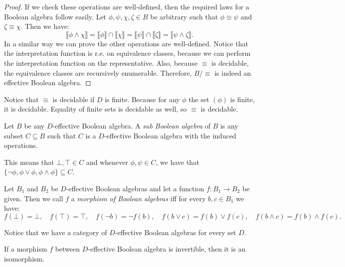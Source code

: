 \begin{proof}
If we check these operations are well-defined, then the required laws for a Boolean algebra follow easily. Let $\phi, \psi, \chi, \zeta \in B$ be arbitrary such that $\phi \equiv \psi$ and $\zeta \equiv \chi$. Then we have:
\[\llbracket \phi \wedge \chi \rrbracket = \llbracket \phi \rrbracket \cap \llbracket \chi \rrbracket = \llbracket \psi \rrbracket \cap \llbracket \zeta \rrbracket = \llbracket \psi \wedge \zeta \rrbracket.\]
In a similar way we can prove the other operations are well-defined. Notice that the interpretation function is r.e. on equivalence classes, because we can perform the interpretation function on the representative. Also, because $\equiv$ is decidable, the equivalence classes are recursively enumerable. Therefore, $B/{\equiv}$ is indeed an effective Boolean algebra. 
\end{proof}

Notice that $\equiv$ is decidable if $D$ is finite. Because for any $\phi$ the set $(\phi)$ is finite, it is decidable. Equality of finite sets is decidable as well, so $\equiv$ is decidable. 

\begin{definition}
Let $B$ be any $D$-effective Boolean algebra. A \emph{sub Boolean algebra} of $B$ is any subset $C \subseteq B$ such that $C$ is a $D$-effective Boolean algebra with the induced operations.
\end{definition}

This means that $\bot, \top \in C$ and whenever $\phi, \psi \in C$, we have that $\{\neg \phi, \phi \vee \phi, \phi \wedge \phi\} \subseteq C$.

\begin{definition}
Let $B_1$ and $B_2$ be $D$-effective Boolean algebras and let a function $f : B_1 \rightarrow B_2$ be given. Then we call $f$ a \emph{morphism of Boolean algebras} iff for every $b, c \in B_1$ we have:
\[f(\bot) = \bot, \quad f(\top) = \top, \quad f(\neg b) = \neg f(b), \quad f(b \vee c) = f(b) \vee f(c), \quad f(b \wedge c) = f(b) \wedge f(c).\]
\end{definition}

Notice that we have a category of $D$-effective Boolean algebras for every set $D$.

\begin{lem}
If a morphism $f$ between $D$-effective Boolean algebra is invertible, then it is an isomorphism.
\end{lem}

